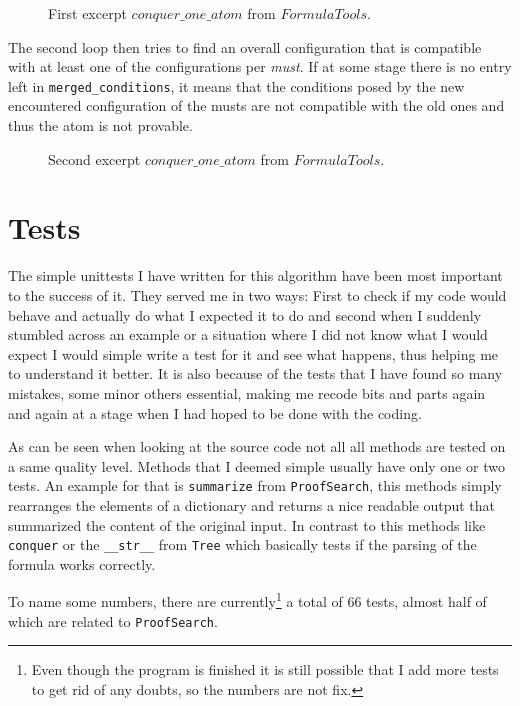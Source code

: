 \begin{figure}[H]
	\caption{First excerpt $conquer\_one\_ atom$ from $FormulaTools$.}
	\vspace{-10pt}
	
	\vspace{-10pt}
\end{figure}

The second loop then tries to find an overall configuration that is compatible with at least one of the configurations per \emph{must}. If at some stage there is no entry left in \texttt{merged\_conditions}, it means that the conditions posed by the new encountered configuration of the musts are not compatible with the old ones and thus the atom is not provable.

\begin{figure}[H]
	\caption{Second excerpt $conquer\_one\_ atom$ from $FormulaTools$.}
	\vspace{-10pt}
	
	\vspace{-10pt}
\end{figure}

\bigskip


\section{Tests}
The simple unittests I have written for this algorithm have been most important to the success of it. They served me in two ways: First to check if my code would behave and actually do what I expected it to do and second when I suddenly stumbled across an example or a situation where I did not know what I would expect I would simple write a test for it and see what happens, thus helping me to understand it better.
It is also because of the tests that I have found so many mistakes, some minor others essential, making me recode bits and parts again and again at a stage when I had hoped to be done with the coding.

As can be seen when looking at the source code not all all methods are tested on a same quality level. Methods that I deemed simple usually have only one or two tests. An example for that is \texttt{summarize} from \texttt{ProofSearch}, this methods simply rearranges the elements of a dictionary and returns a nice readable output that summarized the content of the original input. In contrast to this methods like \texttt{conquer} or the \texttt{__str__} from \texttt{Tree} which basically tests if the parsing of the formula works correctly.

To name some numbers, there are currently\footnote{Even though the program is finished it is still possible that I add more tests to get rid of any doubts, so the numbers are not fix.} a total of 66 tests, almost half of which are related to \texttt{ProofSearch}. 